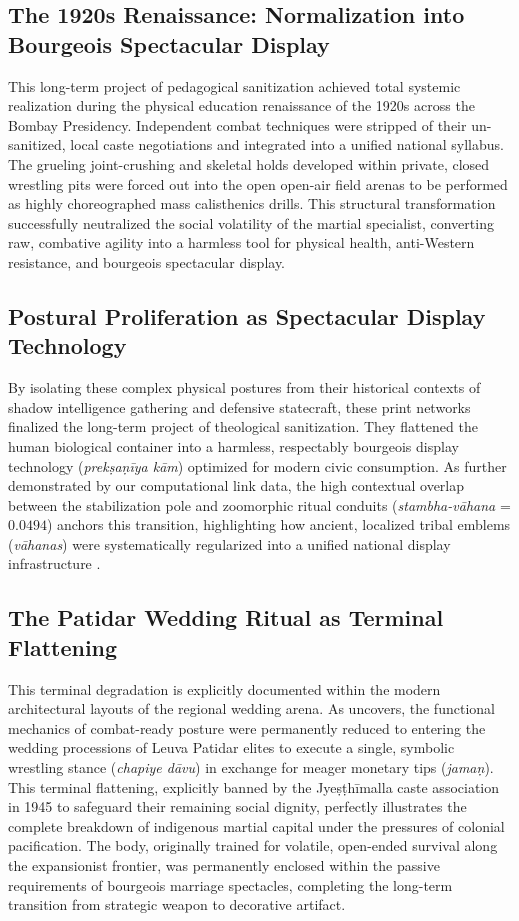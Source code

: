 \documentclass[11pt,twoside,letterpaper]{article}
\begin{document}
\subsection{The 1920s Renaissance: Normalization into Bourgeois Spectacular Display}
This long-term project of pedagogical sanitization achieved total systemic realization during the physical education renaissance of the 1920s across the Bombay Presidency. Independent combat techniques were stripped of their un-sanitized, local caste negotiations and integrated into a unified national syllabus. The grueling joint-crushing and skeletal holds developed within private, closed wrestling pits were forced out into the open open-air field arenas to be performed as highly choreographed mass calisthenics drills. This structural transformation successfully neutralized the social volatility of the martial specialist, converting raw, combative agility into a harmless tool for physical health, anti-Western resistance, and bourgeois spectacular display.

\subsection{Postural Proliferation as Spectacular Display Technology}
By isolating these complex physical postures from their historical contexts of shadow intelligence gathering and defensive statecraft, these print networks finalized the long-term project of theological sanitization. They flattened the human biological container into a harmless, respectably bourgeois display technology (\textit{prek\d{s}a\d{n}\={i}ya k\={a}m}) optimized for modern civic consumption. As further demonstrated by our computational link data, the high contextual overlap between the stabilization pole and zoomorphic ritual conduits (\textit{stambha-v\={a}hana} = $0.0494$) anchors this transition, highlighting how ancient, localized tribal emblems (\textit{v\={a}hanas}) were systematically regularized into a unified national display infrastructure \citep{Abbasi2001}.

\subsection{The Patidar Wedding Ritual as Terminal Flattening}
This terminal degradation is explicitly documented within the modern architectural layouts of the regional wedding arena. As \citet{Sandesara1948} uncovers, the functional mechanics of combat-ready posture were permanently reduced to entering the wedding processions of Leuva Patidar elites to execute a single, symbolic wrestling stance (\textit{chapiye d\={a}vu}) in exchange for meager monetary tips (\textit{jama\d{n}}). This terminal flattening, explicitly banned by the Jye\d{s}\d{t}h\={i}malla caste association in 1945 to safeguard their remaining social dignity, perfectly illustrates the complete breakdown of indigenous martial capital under the pressures of colonial pacification. The body, originally trained for volatile, open-ended survival along the expansionist frontier, was permanently enclosed within the passive requirements of bourgeois marriage spectacles, completing the long-term transition from strategic weapon to decorative artifact.
\end{document}
